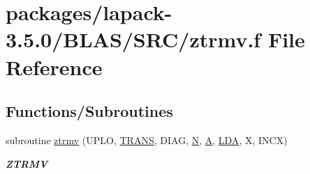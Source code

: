 \hypertarget{lapack-3_85_80_2BLAS_2SRC_2ztrmv_8f}{}\section{packages/lapack-\/3.5.0/\+B\+L\+A\+S/\+S\+R\+C/ztrmv.f File Reference}
\label{lapack-3_85_80_2BLAS_2SRC_2ztrmv_8f}
\subsection*{Functions/\+Subroutines}
\begin{DoxyCompactItemize}
\item 
subroutine \hyperlink{group__complex16__blas__level2_ga5a60882e2e5a7d604f2f16c1e0d8f4b4}{ztrmv} (U\+P\+L\+O, \hyperlink{superlu__enum__consts_8h_a0c4e17b2d5cea33f9991ccc6a6678d62a1f61e3015bfe0f0c2c3fda4c5a0cdf58}{T\+R\+A\+N\+S}, D\+I\+A\+G, \hyperlink{polmisc_8c_a0240ac851181b84ac374872dc5434ee4}{N}, \hyperlink{classA}{A}, \hyperlink{example__user_8c_ae946da542ce0db94dced19b2ecefd1aa}{L\+D\+A}, X, I\+N\+C\+X)
\begin{DoxyCompactList}\small\item\em {\bfseries Z\+T\+R\+M\+V} \end{DoxyCompactList}\end{DoxyCompactItemize}
